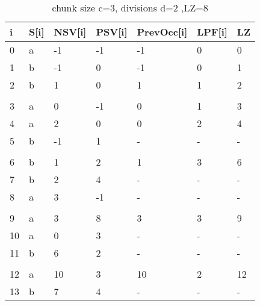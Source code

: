\begin{table}[h]
\centering
\begin{tabular}{@{}lllllll@{}}
\toprule
i  & S{[}i{]} & NSV{[}i{]} & PSV{[}i{]} & PrevOcc{[}i{]} & LPF{[}i{]} & LZ \\ \midrule
0  & a        & -1         & -1         & -1             & 0          & 0  \\
1  & b        & -1         & 0          & -1             & 0          & 1  \\
2  & b        & 1          & 0          & 1              & 1          & 2  \\
   &          &            &            &                &            &    \\
3  & a        & 0          & -1         & 0              & 1          & 3  \\
4  & a        & 2          & 0          & 0              & 2          & 4  \\
5  & b        & -1         & 1          & -              & -          & -  \\
   &          &            &            &                &            &    \\
6  & b        & 1          & 2          & 1              & 3          & 6  \\
7  & b        & 2          & 4          & -              & -          & -  \\
8  & a        & 3          & -1         & -              & -          & -  \\
   &          &            &            &                &            &    \\
9  & a        & 3          & 8          & 3              & 3          & 9  \\
10 & a        & 0          & 3          & -              & -          & -  \\
11 & b        & 6          & 2          & -              & -          & -  \\
   &          &            &            &                &            &    \\
12 & a        & 10         & 3          & 10             & 2          & 12 \\
13 & b        & 7          & 4          & -              & -          & -  \\ \bottomrule
\end{tabular}
\caption{chunk size c=3, divisions d=2 ,LZ=8}
\label{tab:example3}
\end{table}

